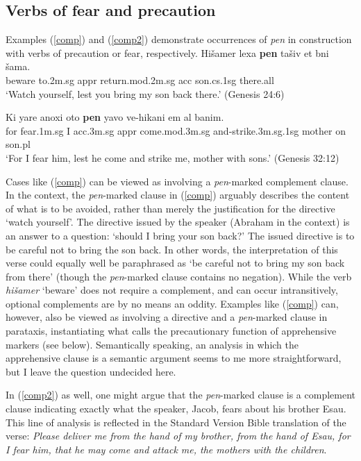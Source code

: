 \documentclass[output=paper,colorlinks,citecolor=brown]{langscibook}
\begin{document}
\subsection{Verbs of fear and precaution}
\label{subsec:verbsfp}
Examples (\ref{comp}) and (\ref{comp2}) demonstrate occurrences of \textit{pen} in construction with verbs of precaution or fear, respectively. 
\ea
\label{comp}
\gll Hišamer lexa \textbf{pen} tašiv et  bni šama. \\
beware to.{\sc  2m.sg} {\sc appr} return.{\sc mod.2m.sg} {\sc acc} son.{\sc cs.1sg} there.{\sc all} \\
\glt `Watch yourself, lest you bring my son back there.' (Genesis 24:6)
\z

\ea
\label{comp2}
\gll Ki yare anoxi oto \textbf{pen} yavo ve-hikani em al banim. \\
 for fear.{\sc 1m.sg} I {\sc acc.3m.sg} {\sc appr} come.{\sc mod.3m.sg} and-strike.{\sc 3m.sg.1sg} mother on son.{\sc pl} \\
\glt  `For I fear him, lest he come and strike me, mother with sons.' (Genesis 32:12)
\z

Cases like (\ref{comp}) can be viewed as involving a \textit{pen}-marked  complement clause. In the context, the \textit{pen}-marked clause in (\ref{comp}) arguably describes the content of what is to be avoided, rather than merely the justification for the directive `watch yourself'. The directive issued by the speaker (Abraham in the context) is an answer to a question: `should I bring your son back?' The issued directive is to be careful not to bring the son back. In other words, the interpretation of this verse could equally well be paraphrased as `be careful not to bring my son back from there' (though the \textit{pen}-marked clause contains no negation). While the verb \textit{hišamer} `beware' does not require a complement, and can occur intransitively, optional complements are by no means an oddity. Examples like (\ref{comp}) can, however, also be viewed as involving a directive and a \textit{pen}-marked clause in parataxis, instantiating what \citet{lichtenberk95} calls the precautionary function of apprehensive markers (see  below). Semantically speaking, an analysis in which the apprehensive clause is a semantic argument seems to me more straightforward, but I leave the question undecided here.
 
In (\ref{comp2}) as well, one might argue that the \textit{pen}-marked clause is a complement clause indicating exactly what the speaker, Jacob, fears about his brother Esau. This line of analysis is reflected in the  Standard Version Bible translation of the verse: \textit{ Please deliver me from the hand of my brother, from the hand of Esau, for I fear him, that he may come and attack me, the mothers with the children}.
\end{document}
